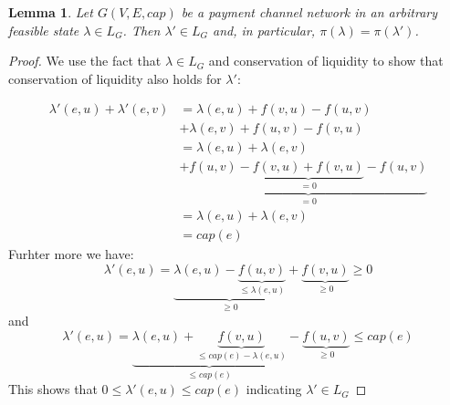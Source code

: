 \documentclass[10pt,twocolumn]{article}
\newtheorem{lemma}[theorem]{Lemma}
\begin{document}
\begin{lemma}
  Let \(G(V,E,cap)\) be a payment channel network in an arbitrary feasible state \(\lambda \in L_G\).  
  Then \(\lambda' \in L_G\) and, in particular, \(\pi(\lambda) = \pi(\lambda')\).
\end{lemma}
\begin{proof}
  We use the fact that \(\lambda \in L_G\) and conservation of liquidity to show that conservation of liquidity also holds for \(\lambda'\):

\begin{equation*}
    \begin{split}
      \lambda'(e,u) + \lambda'(e,v) & = \lambda(e,u) + f(v,u) - f(u,v) \\
       & + \lambda(e,v) + f(u,v) - f(v,u)\\
      & = \lambda(e,u) + \lambda(e,v) \\
      & + \underbrace{f(u,v) - \underbrace{f(v,u) + f(v,u)}_{=0} - f(u,v)}_{=0}\\
      & = \lambda(e,u) + \lambda(e,v) \\
      & = cap(e)
    \end{split}
  \end{equation*}
  Furhter more we have: 
  \begin{equation}
    \lambda'(e,u) = \underbrace{\lambda(e,u) - \underbrace{f(u,v)}_{\leq \lambda(e,u)}}_{\geq 0} +\underbrace{f(v,u)}_{\geq 0} \geq 0
  \end{equation}
and
  \begin{equation}
    \lambda'(e,u) = \underbrace{\lambda(e,u) + \underbrace{f(v,u)}_{\leq cap(e) - \lambda(e,u)}}_{\leq cap(e)} -\underbrace{f(u,v)}_{\geq 0} \leq cap(e)
  \end{equation}
  This shows that $0\leq \lambda'(e,u) \leq cap(e)$ indicating $\lambda'\in L_G$
  

\end{proof}
\end{document}
